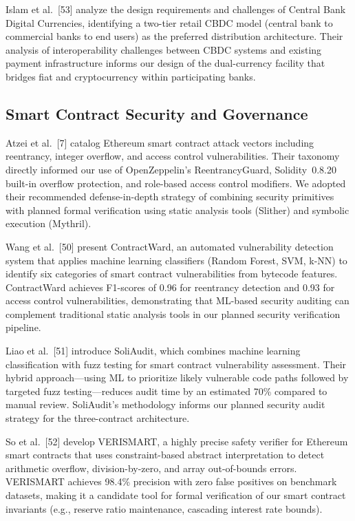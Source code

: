 \documentclass[12pt,a4paper]{report}
\begin{document}
Islam et al.~[53] analyze the design requirements and challenges of Central Bank Digital Currencies, identifying a two-tier retail CBDC model (central bank to commercial banks to end users) as the preferred distribution architecture. Their analysis of interoperability challenges between CBDC systems and existing payment infrastructure informs our design of the dual-currency facility that bridges fiat and cryptocurrency within participating banks.

\subsection{Smart Contract Security and Governance}

Atzei et al.~[7] catalog Ethereum smart contract attack vectors including reentrancy, integer overflow, and access control vulnerabilities. Their taxonomy directly informed our use of OpenZeppelin's ReentrancyGuard, Solidity~0.8.20 built-in overflow protection, and role-based access control modifiers. We adopted their recommended defense-in-depth strategy of combining security primitives with planned formal verification using static analysis tools (Slither) and symbolic execution (Mythril).

Wang et al.~[50] present ContractWard, an automated vulnerability detection system that applies machine learning classifiers (Random Forest, SVM, k-NN) to identify six categories of smart contract vulnerabilities from bytecode features. ContractWard achieves F1-scores of 0.96 for reentrancy detection and 0.93 for access control vulnerabilities, demonstrating that ML-based security auditing can complement traditional static analysis tools in our planned security verification pipeline.

Liao et al.~[51] introduce SoliAudit, which combines machine learning classification with fuzz testing for smart contract vulnerability assessment. Their hybrid approach---using ML to prioritize likely vulnerable code paths followed by targeted fuzz testing---reduces audit time by an estimated 70\% compared to manual review. SoliAudit's methodology informs our planned security audit strategy for the three-contract architecture.

So et al.~[52] develop VERISMART, a highly precise safety verifier for Ethereum smart contracts that uses constraint-based abstract interpretation to detect arithmetic overflow, division-by-zero, and array out-of-bounds errors. VERISMART achieves 98.4\% precision with zero false positives on benchmark datasets, making it a candidate tool for formal verification of our smart contract invariants (e.g., reserve ratio maintenance, cascading interest rate bounds).
\end{document}
